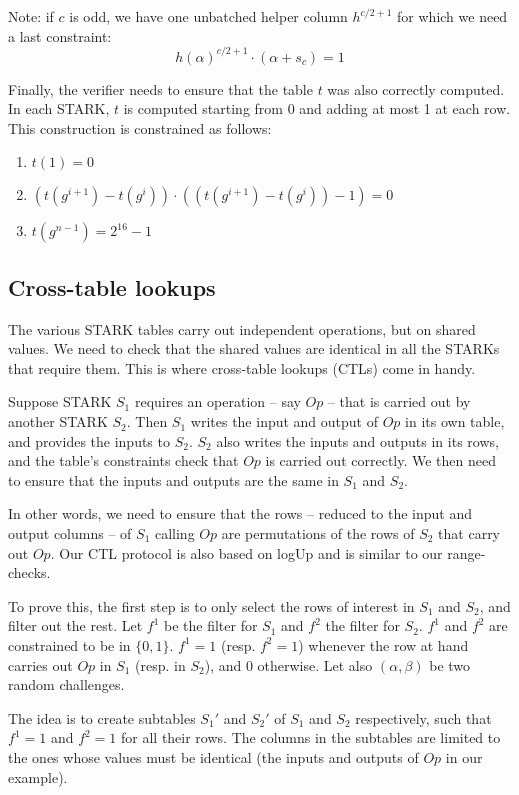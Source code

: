 Note: if $c$ is odd, we have one unbatched helper column $h^{c/2+1}$ for which we need a last constraint:
$$
  h(\alpha)^{c/2+1} \cdot (\alpha + s_{c}) = 1
$$

Finally, the verifier needs to ensure that the table $t$ was also correctly computed. In each STARK, $t$ is computed starting from 0 and adding at most 1 at each row. This construction is constrained as follows:
\begin{enumerate}
  \item $t(1) = 0$
  \item $(t(g^{i+1}) - t(g^{i})) \cdot ((t(g^{i+1}) - t(g^{i})) - 1) = 0$
  \item $t(g^{n-1}) = 2^{16} - 1$
\end{enumerate}

\subsection{Cross-table lookups}
\label{ctl}
The various STARK tables carry out independent operations, but on shared values. We need to check that the shared values are identical in all the STARKs that require them. This is where cross-table lookups (CTLs) come in handy. 

Suppose STARK $S_1$ requires an operation -- say $Op$ -- that is carried out by another STARK $S_2$. Then $S_1$ writes the input and output of $Op$ in its own table, and provides the inputs to $S_2$. $S_2$ also writes the inputs and outputs in its rows, and the table's constraints check that $Op$ is carried out correctly. We then need to ensure that the inputs and outputs are the same in $S_1$ and $S_2$.

In other words, we need to ensure that the rows -- reduced to the input and output columns -- of $S_1$ calling $Op$ are permutations of the rows of $S_2$ that carry out $Op$. Our CTL protocol is also based on logUp and is similar to our range-checks.

To prove this, the first step is to only select the rows of interest in $S_1$ and $S_2$, and filter out the rest. Let $f^1$ be the filter for $S_1$ and $f^2$ the filter for $S_2$. $f^1$ and $f^2$ are constrained to be in $\{0, 1\}$. $f^1 = 1$ (resp. $f^2 = 1$) whenever the row at hand carries out $Op$ in $S_1$ (resp. in $S_2$), and 0 otherwise. Let also $(\alpha, \beta)$ be two random challenges.

The idea is to create subtables $S_1'$ and $S_2'$ of $S_1$ and $S_2$ respectively, such that $f^1 = 1$ and $f^2 = 1$ for all their rows. The columns in the subtables are limited to the ones whose values must be identical (the inputs and outputs of $Op$ in our example).

